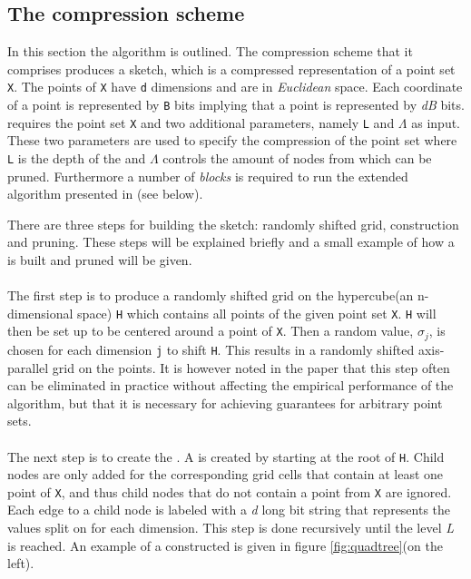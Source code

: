 \subsection{The \qs{} compression scheme}
\label{qs}
In this section the \qs{} algorithm is outlined. The compression scheme that it comprises produces a sketch, which is a compressed representation of a point set \texttt{X}. The points of \texttt{X} have \texttt{d} dimensions and are in \textit{Euclidean} space. Each coordinate of a point is represented by \texttt{B} bits implying that a point is represented by \textit{dB} bits. \qs{} requires the point set \texttt{X} and two additional parameters, namely \texttt{L} and $\Lambda$ as input. These two parameters are used to specify the compression of the point set where \texttt{L} is the depth of the \qt{} and $\Lambda$ controls the amount of nodes from \qt{} which can be pruned. Furthermore a number of \textit{blocks} is required to run the extended algorithm presented in (see below).

There are three steps for building the sketch: randomly shifted grid, \qt{} construction and pruning. These steps will be explained briefly and a small example of how a \qt{} is built and pruned will be given.
\\
\\
The first step is to produce a randomly shifted grid on the hypercube(an n-dimensional space) \texttt{H} which contains all points of the given point set \texttt{X}. \texttt{H} will then be set up to be centered around a point of \texttt{X}. Then a random value, $\sigma_j$, is chosen for each dimension \texttt{j} to shift \texttt{H}. This results in a randomly shifted axis-parallel grid on the points. It is however noted in the paper that this step often can be eliminated in practice without affecting the empirical performance of the algorithm, but that it is necessary for achieving guarantees for arbitrary point sets\cite[p. 4, "Step 1"]{wagner17}.
\\
\\
The next step is to create the \qt{}. A \qt{} is created by starting at the root of \texttt{H}. Child nodes are only added for the corresponding grid cells that contain at least one point of \texttt{X}, and thus child nodes that do not contain a point from \texttt{X} are ignored. Each edge to a child node is labeled with a \textit{d} long bit string that represents the values split on for each dimension. This step is done recursively until the level \textit{L} is reached. An example of a constructed \qt{} is given in figure \ref{fig:quadtree}(on the left).\\

